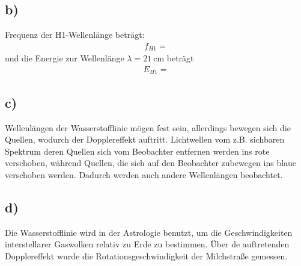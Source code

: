 \subsection{b)}

\justifying Frequenz der H1-Wellenlänge beträgt:
\begin{align*}
    f_{H1}=\text{}
\end{align*}
und die Energie zur Wellenlänge $\lambda = \SI{21}{\centi\meter} $ beträgt
\begin{align}
    E_{H1}=\text{}
\end{align}


\subsection{c)}

\justifying Wellenlängen der Wasserstofflinie mögen fest sein, allerdings bewegen sich
die Quellen, wodurch der Dopplereffekt auftritt. Lichtwellen vom z.B. sichbaren Spektrum deren Quellen sich vom
Beobachter entfernen werden ins rote verschoben, während Quellen, die sich auf den
Beobachter zubewegen ins blaue verschoben werden. Dadurch werden auch andere Wellenlängen  
beobachtet. 


\subsection{d)}

Die Wasserstofflinie wird in der Astrologie benutzt, um die Geschwindigkeiten 
interstellarer Gaswolken relativ zu Erde zu bestimmen. Über de auftretenden Dopplereffekt wurde
die Rotationsgeschwindigkeit der Milchstraße gemessen.


